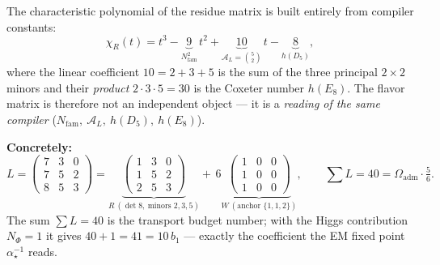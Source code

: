 \documentclass[11pt,a4paper]{article}
\newcommand{\Nfam}{N_{\mathrm{fam}}}
\newcommand{\Oadm}{\Omega_{\mathrm{adm}}}
\newcommand{\ainv}{\alpha^{-1}_\star}
\theoremstyle{definition}
\begin{document}
\begin{center}
\end{center}

\begin{winbox}
The characteristic polynomial of the residue matrix is built entirely from compiler constants:
\[
  \chi_R(t)=t^3-\underbrace{9}_{\Nfam^2}\,t^2+\underbrace{10}_{\mathcal A_L=\binom52}\,t-\underbrace{8}_{h(D_5)} ,
\]
where the linear coefficient $10=2+3+5$ is the sum of the three principal $2{\times}2$ minors and their
\emph{product} $2\cdot3\cdot5=30$ is the Coxeter number $h(E_8)$. The flavor matrix is therefore not an
independent object --- it is a \emph{reading of the same compiler} ($\Nfam,\ \mathcal A_L,\ h(D_5),\
h(E_8)$). \mE\ 
\end{winbox}

\noindent\textbf{Concretely:}
\[
  L=\begin{pmatrix}7&3&0\\7&5&2\\8&5&3\end{pmatrix}
  =\underbrace{\begin{pmatrix}1&3&0\\1&5&2\\2&5&3\end{pmatrix}}_{R\ (\det 8,\ \text{minors }2{,}3{,}5)}
  +\,6\underbrace{\begin{pmatrix}1&0&0\\1&0&0\\1&0&0\end{pmatrix}}_{W\ (\text{anchor }\{1,1,2\})},\qquad
  \textstyle\sum L=40=\Oadm\cdot\tfrac56 .
\]
The sum $\sum L=40$ is the transport budget number; with the Higgs contribution $N_\Phi=1$ it gives
$40+1=41=10\,b_1$ --- exactly the coefficient the EM fixed point $\ainv$ reads.
\end{document}
